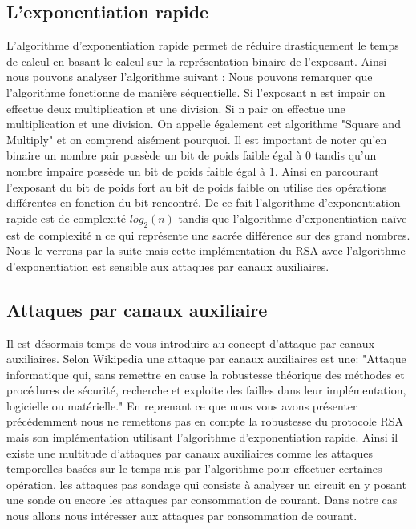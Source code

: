 \subsection{L’exponentiation rapide}
L'algorithme d’exponentiation rapide permet de réduire drastiquement le temps de calcul en basant le calcul sur la représentation binaire de l'exposant. Ainsi nous pouvons analyser l'algorithme suivant :
Nous pouvons remarquer que l'algorithme fonctionne de manière séquentielle. Si l'exposant n est impair on effectue deux multiplication et une division. Si n pair on effectue une multiplication et une division. On appelle également cet algorithme "Square and Multiply" et on comprend aisément pourquoi.
Il est important de noter qu'en binaire un nombre pair possède un bit de poids faible égal à 0 tandis qu'un nombre impaire possède un bit de poids faible égal à 1.
Ainsi en parcourant l'exposant du bit de poids fort au bit de poids faible on utilise des opérations différentes en fonction du bit rencontré.
De ce fait l’algorithme d’exponentiation rapide est de complexité $log_2(n)$ tandis que l'algorithme d'exponentiation naïve est de complexité n ce qui représente une sacrée différence sur des grand nombres.
Nous le verrons par la suite mais cette implémentation du RSA avec l'algorithme d'exponentiation est sensible aux attaques par canaux auxiliaires.
\newpage
\subsection{Attaques par canaux auxiliaire}
Il est désormais temps de vous introduire au concept d'attaque par canaux auxiliaires.
Selon Wikipedia une attaque par canaux auxiliaires est une:
"Attaque informatique qui, sans remettre en cause la robustesse théorique des méthodes et procédures de sécurité, recherche et exploite des failles dans leur implémentation, logicielle ou matérielle."
En reprenant ce que nous vous avons présenter précédemment nous ne remettons pas en compte la robustesse du protocole RSA mais son implémentation utilisant l'algorithme d’exponentiation rapide.
Ainsi il existe une multitude d'attaques par canaux auxiliaires comme les attaques temporelles basées sur le temps mis par l'algorithme pour effectuer certaines opération, les attaques pas sondage qui consiste à analyser un circuit en y posant une sonde ou encore les attaques par consommation de courant.
Dans notre cas nous allons nous intéresser aux attaques par consommation de courant.